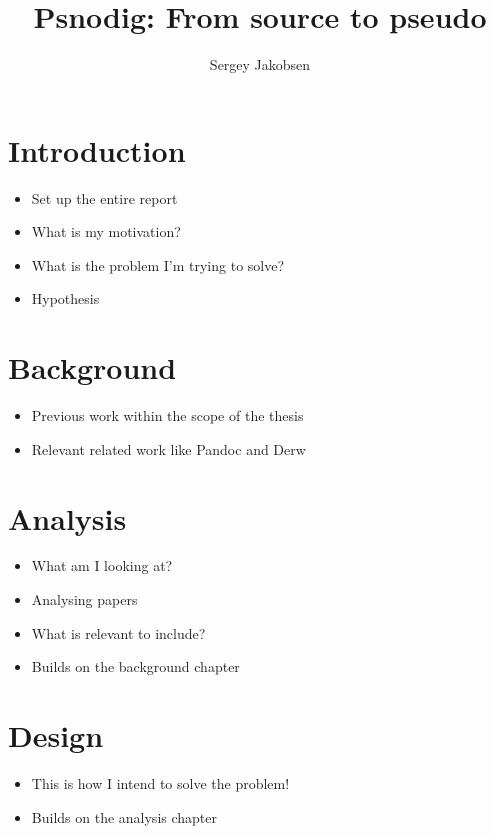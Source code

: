 \documentclass{article}
\title{Psnodig: From source to pseudo}
\author{Sergey Jakobsen}
\begin{document}
\maketitle



\section{Introduction}
\begin{itemize}
    \item Set up the entire report
    \item What is my motivation?
    \item What is the problem I'm trying to solve?
    \item Hypothesis
\end{itemize}

\section{Background}
\begin{itemize}
    \item Previous work within the scope of the thesis
    \item Relevant related work like Pandoc and Derw
\end{itemize}

\section{Analysis}
\begin{itemize}
    \item What am I looking at?
    \item Analysing papers
    \item What is relevant to include?
    \item Builds on the background chapter
\end{itemize}

\section{Design}
\begin{itemize}
    \item This is how I intend to solve the problem!
    \item Builds on the analysis chapter
\end{itemize}
\end{document}
